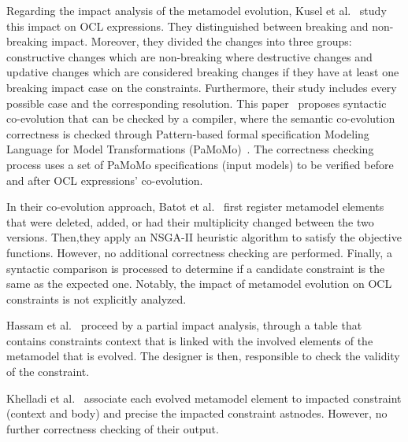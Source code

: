  Regarding the impact analysis of the metamodel evolution, Kusel et al.~\cite{kusel2014systematic} study this impact on OCL expressions. They distinguished between breaking and non-breaking impact. Moreover, they divided the changes into three groups: constructive changes which are non-breaking where destructive changes and updative changes which are considered breaking changes if they have at least one breaking impact case on the constraints. Furthermore, their study includes %
  every possible case and the corresponding resolution. This paper~\cite{kusel2014systematic} proposes syntactic co-evolution that can be checked by a compiler, where the semantic co-evolution correctness is checked through Pattern-based formal specification Modeling Language for Model Transformations (PaMoMo)~\cite{10.1007/s10515-012-0102-y}. The correctness checking process uses a set of PaMoMo specifications (input models) to be verified before and after OCL expressions' co-evolution.

In their co-evolution approach, Batot et al.~\cite{batot2017heuristic} first register metamodel elements that were deleted, added, or had their multiplicity changed between the two versions. %
 Then,they apply an NSGA-II heuristic algorithm to satisfy the objective functions. However, no additional correctness checking are performed. Finally, a syntactic comparison is processed to determine if a candidate constraint is the same as the expected one. Notably, the impact of metamodel evolution on OCL constraints is not explicitly analyzed.
  
   
  
 
Hassam et al.~\cite{hassam2011assistance} proceed by a partial impact analysis, through a table that contains constraints context that is linked with the involved elements of the metamodel that is evolved. The designer is then, responsible to check the validity of the constraint. 

Khelladi et al.~\cite{khelladi2017semi} associate each evolved metamodel element to impacted constraint (context and body)  and precise the impacted constraint astnodes. However, no further correctness checking of their output.

